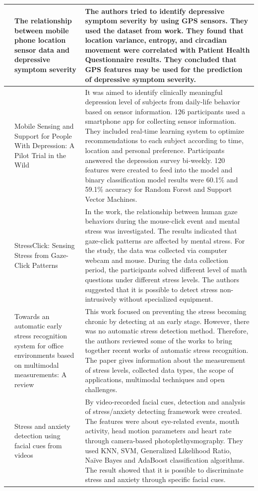 \documentclass[12pt,oneandhalf,chaparabic,lfm,phd,eng,oneside,pntc]{gsufbe}
\begin{document}
\begin{longtable}[c]{| P{2cm} | P{3cm} | P{9cm} |}
\cite{saeb2016relationship} & The relationship between mobile phone location sensor data and depressive symptom severity & The authors tried to identify depressive symptom severity by using GPS sensors. They used the dataset from \cite{wang2014studentlife} work. They found that location variance, entropy, and circadian movement were correlated with Patient Health Questionnaire results. They concluded that GPS features may be used for the prediction of depressive symptom severity. \\ \hline
\cite{wahle2016mobile} & Mobile Sensing and Support for People With Depression: A Pilot Trial in the Wild & It was aimed to identify clinically meaningful depression level of subjects from daily-life behavior based on sensor information. 126 participants used a smartphone app for collecting sensor information. They included real-time learning system to optimize recommendations to each subject according to time, location and personal preference. Participants answered the depression survey bi-weekly. 120 features were created to feed into the model and binary classification model results were 60.1\% and 59.1\% accuracy for Random Forest and Support Vector Machines. \\ \hline
\cite{huang2016stressclick} & StressClick: Sensing Stress from Gaze-Click Patterns & In the work, the relationship between human gaze behaviors during the mouse-click event and mental stress was investigated. The results indicated that gaze-click patterns are affected by mental stress. For the study, the data was collected via computer webcam and mouse. During the data collection period, the participants solved different level of math questions under different stress levels. The authors suggested that it is possible to detect stress non-intrusively without specialized equipment. \\ \hline
\cite{alberdi2016towards} & Towards an automatic early stress recognition system for office environments based on multimodal measurements: A review & This work focused on preventing the stress becoming chronic by detecting at an early stage. However, there was no automatic stress detection method. Therefore, the authors reviewed some of the works to bring together recent works of automatic stress recognition. The paper gives information about the measurement of stress levels, collected data types, the scope of applications, multimodal techniques and open challenges. \\ \hline
\cite{giannakakis2017stress} & Stress and anxiety detection using facial cues from videos & By video-recorded facial cues, detection and analysis of stress/anxiety detecting framework were created. The features were about eye-related events, mouth activity, head motion parameters and heart rate through camera-based photoplethysmography. They used KNN, SVM, Generalized Likelihood Ratio, Naïve Bayes and AdaBoost classification algorithms. The result showed that it is possible to discriminate stress and anxiety through specific facial cues. \\ \hline
\end{longtable}
\end{document}
